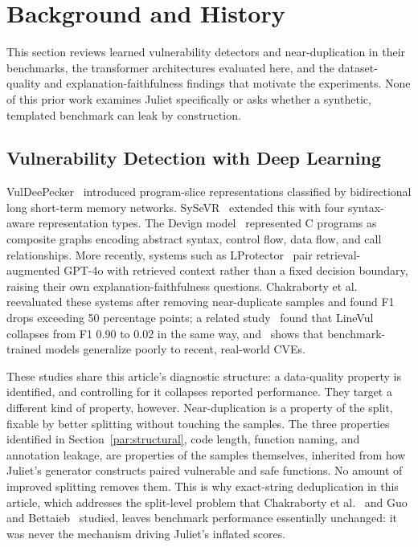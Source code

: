 \documentclass{ieeeaccess}
\begin{document}
\section{Background and History}
\label{sec:bg}
This section reviews learned vulnerability detectors and near-duplication in their benchmarks, the transformer architectures evaluated here, and the dataset-quality and explanation-faithfulness findings that motivate the experiments. None of this prior work examines Juliet specifically or asks whether a synthetic, templated benchmark can leak by construction.

\subsection{Vulnerability Detection with Deep Learning}
\label{subsec:bg-dl}
VulDeePecker~\cite{ref4} introduced program-slice representations classified by bidirectional long short-term memory networks. SySeVR~\cite{ref5} extended this with four syntax-aware representation types. The Devign model~\cite{ref6} represented C programs as composite graphs encoding abstract syntax, control flow, data flow, and call relationships. More recently, systems such as LProtector~\cite{ref13} pair retrieval-augmented GPT-4o with retrieved context rather than a fixed decision boundary, raising their own explanation-faithfulness questions. Chakraborty et al.~\cite{ref1} reevaluated these systems after removing near-duplicate samples and found F1 drops exceeding 50 percentage points; a related study~\cite{ref9} found that LineVul collapses from F1 0.90 to 0.02 in the same way, and~\cite{ref14} shows that benchmark-trained models generalize poorly to recent, real-world CVEs.

These studies share this article's diagnostic structure: a data-quality property is identified, and controlling for it collapses reported performance. They target a different kind of property, however. Near-duplication is a property of the split, fixable by better splitting without touching the samples. The three properties identified in Section~\ref{par:structural}, code length, function naming, and annotation leakage, are properties of the samples themselves, inherited from how Juliet's generator constructs paired vulnerable and safe functions. No amount of improved splitting removes them. This is why exact-string deduplication in this article, which addresses the split-level problem that Chakraborty et al.~\cite{ref1} and Guo and Bettaieb~\cite{ref10} studied, leaves benchmark performance essentially unchanged: it was never the mechanism driving Juliet's inflated scores.
\end{document}
